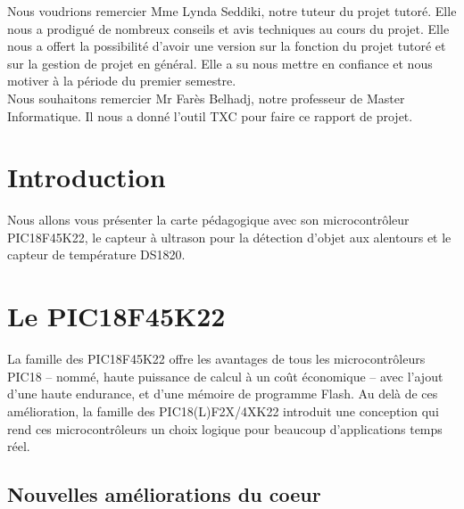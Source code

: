 \documentclass[a4paper, 12pt]{book}
\newcounter{program}[subsection]
\begin{document}
Nous voudrions remercier Mme Lynda Seddiki, notre tuteur du projet tutoré. Elle nous a prodigué de nombreux conseils et avis techniques au cours du projet. Elle nous a offert la possibilité d’avoir une version sur la fonction du projet tutoré et sur la gestion de projet en général. Elle a su nous mettre en confiance et nous motiver à la période du premier semestre.\\

Nous souhaitons remercier Mr Farès Belhadj, notre professeur de Master Informatique. Il nous a donné l’outil TXC pour faire ce rapport de projet.


\chapter{Introduction}
Nous allons vous présenter la carte pédagogique avec son microcontrôleur PIC18F45K22, le capteur à ultrason pour la détection d'objet aux alentours et le capteur de température DS1820.
\chapter{Le PIC18F45K22}
La famille des PIC18F45K22 offre les avantages de tous les microcontrôleurs  PIC18 – nommé, haute puissance de calcul à un coût économique – avec l’ajout d’une haute endurance, et d’une mémoire de programme Flash. Au delà de ces amélioration, la famille des PIC18(L)F2X/4XK22 introduit une conception qui rend ces microcontrôleurs un choix logique pour beaucoup d’applications temps réel.\\

\section{Nouvelles améliorations du coeur}
\end{document}
